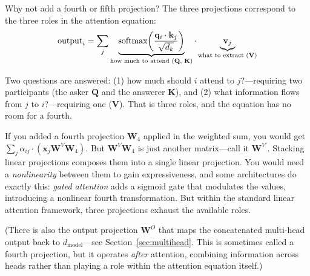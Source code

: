 \begin{whynotbox}{Why not add a fourth or fifth projection?}
The three projections correspond to the three roles in the attention equation:
\[
\text{output}_i = \sum_j \underbrace{\text{softmax}\!\left(\frac{\mathbf{q}_i \cdot \mathbf{k}_j}{\sqrt{d_k}}\right)}_{\text{how much to attend (\textbf{Q}, \textbf{K})}} \cdot \underbrace{\mathbf{v}_j}_{\text{what to extract (\textbf{V})}}
\]

Two questions are answered: (1) how much should $i$ attend to $j$?---requiring two participants (the asker $\mathbf{Q}$ and the answerer $\mathbf{K}$), and (2) what information flows from $j$ to $i$?---requiring one ($\mathbf{V}$). That is three roles, and the equation has no room for a fourth.

If you added a fourth projection $\mathbf{W}_4$ applied in the weighted sum, you would get $\sum_j \alpha_{ij} \cdot (\mathbf{x}_j \mathbf{W}^V \mathbf{W}_4)$. But $\mathbf{W}^V \mathbf{W}_4$ is just another matrix---call it $\mathbf{W}^{V'}$. Stacking linear projections composes them into a single linear projection. You would need a \emph{nonlinearity} between them to gain expressiveness, and some architectures do exactly this: \emph{gated attention} adds a sigmoid gate that modulates the values, introducing a nonlinear fourth transformation. But within the standard linear attention framework, three projections exhaust the available roles.

(There is also the output projection $\mathbf{W}^O$ that maps the concatenated multi-head output back to $d_{\text{model}}$---see Section~\ref{sec:multihead}. This is sometimes called a fourth projection, but it operates \emph{after} attention, combining information across heads rather than playing a role within the attention equation itself.)
\end{whynotbox}

